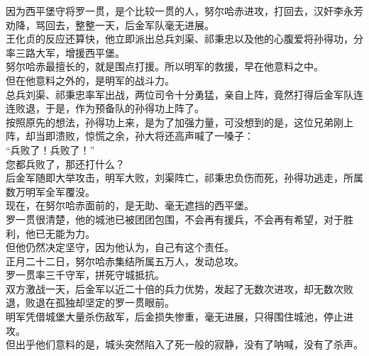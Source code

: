 \begin{multicols}{\theparacolNo}
因为西平堡守将罗一贯，是个比较一贯的人，努尔哈赤进攻，打回去，汉奸李永芳劝降，骂回去，整整一天，后金军队毫无进展。\\

王化贞的反应还算快，他立即派出总兵刘渠、祁秉忠以及他的心腹爱将孙得功，分率三路大军，增援西平堡。\\

努尔哈赤最擅长的，就是围点打援。所以明军的救援，早在他意料之中。\\

但在他意料之外的，是明军的战斗力。\\

总兵刘渠、祁秉忠率军出战，两位司令十分勇猛，亲自上阵，竟然打得后金军队连连败退，于是，作为预备队的孙得功上阵了。\\

按照原先的想法，孙得功上来，是为了加强力量，可没想到的是，这位兄弟刚上阵，却当即溃败，惊慌之余，孙大将还高声喊了一嗓子：\\

“兵败了！兵败了！”\\

您都兵败了，那还打什么？\\

后金军随即大举攻击，明军大败，刘渠阵亡，祁秉忠负伤而死，孙得功逃走，所属数万明军全军覆没。\\

现在，在努尔哈赤面前的，是无助、毫无遮挡的西平堡。\\

罗一贯很清楚，他的城池已被团团包围，不会再有援兵，不会再有希望，对于胜利，他已无能为力。\\

但他仍然决定坚守，因为他认为，自己有这个责任。\\

正月二十二日，努尔哈赤集结所属五万人，发动总攻。\\

罗一贯率三千守军，拼死守城抵抗。\\

双方激战一天，后金军以近二十倍的兵力优势，发起了无数次进攻，却无数次败退，败退在孤独却坚定的罗一贯眼前。\\

明军凭借城堡大量杀伤敌军，后金损失惨重，毫无进展，只得围住城池，停止进攻。\\

但出乎他们意料的是，城头突然陷入了死一般的寂静，没有了呐喊，没有了杀声。\\


\end{multicols}
